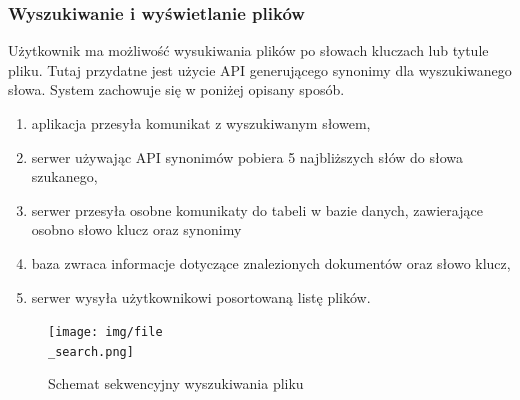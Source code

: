 \documentclass[12pt,a4paper,twoside]{article}
\begin{document}
\subsubsection*{Wyszukiwanie i wyświetlanie plików}
Użytkownik ma możliwość wysukiwania plików po słowach kluczach lub tytule pliku. Tutaj przydatne jest użycie API generującego synonimy dla wyszukiwanego słowa. System zachowuje się w poniżej opisany sposób.
\begin{enumerate}
	\item aplikacja przesyła komunikat z wyszukiwanym słowem,
	\item serwer używając API synonimów pobiera 5 najbliższych słów do słowa szukanego,
	\item serwer przesyła osobne komunikaty do tabeli w bazie danych, zawierające osobno słowo klucz oraz synonimy
	\item baza zwraca informacje dotyczące znalezionych dokumentów oraz słowo klucz,
	\item serwer wysyła użytkownikowi posortowaną listę plików.
\end{enumerate}
\begin{figure}[h!]
\centering
  \texttt{[image: img/file\\\_search.png]}
  \caption{Schemat sekwencyjny wyszukiwania pliku}
\end{figure}
\end{document}
